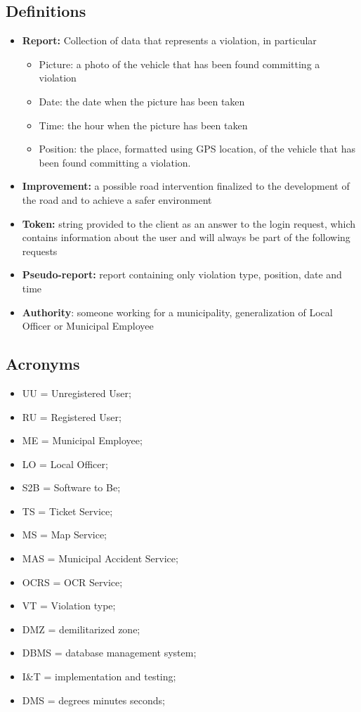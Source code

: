 			\subsection{Definitions}
				\begin{itemize}
					\item \textbf{Report:} Collection of data that represents a violation, in particular
						\begin{itemize}
							\item Picture: a photo of the vehicle that has been found committing a violation
							\item Date: the date when the picture has been taken
							\item Time: the hour when the picture has been taken
							\item Position: the place, formatted using GPS location, of the vehicle that has been found committing a violation.
						\end{itemize}
					\item \textbf{Improvement:} a possible road intervention finalized to the development of the road and to achieve a safer environment
					\item \textbf{Token:} string provided to the client as an answer to the login request, which contains information about the user and will always be part of the following requests
					\item \textbf{Pseudo-report:} report containing only violation type, position, date and time
					\item \textbf{Authority}: someone working for a municipality, generalization of Local Officer or Municipal Employee
				\end{itemize}
			\subsection{Acronyms}
				\begin{itemize}
					\item UU = Unregistered User;
					\item RU = Registered User;
					\item ME = Municipal Employee;
					\item LO = Local Officer;
					\item S2B = Software to Be;
					\item TS = Ticket Service;
					\item MS = Map Service;
					\item MAS = Municipal Accident Service;
					\item OCRS = OCR Service;
					\item VT = Violation type;
					\item DMZ = demilitarized zone;
					\item DBMS = database management system;
					\item I\&T = implementation and testing;
					\item DMS = degrees minutes seconds;
				\end{itemize}
					
